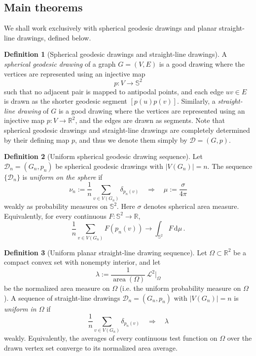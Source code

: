 \documentclass[reqno, 11pt]{amsart}
\theoremstyle{definition}
\newtheorem{definition}{Definition}
\newcommand{\dd}{\mathrm{d}}
\begin{document}
\subsection{Main theorems}


We shall work exclusively with spherical geodesic drawings and planar straight-line drawings, defined below.

\begin{definition}[Spherical geodesic drawings and straight-line drawings]\label{def:spherical-geodesic-drawing}
A \emph{spherical geodesic drawing} of a graph \(G=(V,E)\) is a good drawing where the vertices are represented using an injective map
\[
        p:V\longrightarrow {\mathbb S}^2
\]
such that no adjacent pair is mapped to antipodal points, and each edge \(uv\in E\) is drawn as the shorter geodesic segment \([p(u)p(v)]\). Similarly, a \emph{straight-line drawing} of $G$ is a good drawing where the vertices are represented using an injective map $p:V\to\mathbb R^2$, and the edges are drawn as segments. Note that spherical geodesic drawings and straight-line drawings are completely determined by their defining map $p$, and thus we denote them simply by ${\mathcal D} = (G,p)$.
\end{definition}

\begin{definition}[Uniform spherical geodesic drawing sequence]\label{def:uniform-spherical-geodesic-sequence}
Let \({\mathcal D}_n=(G_n,p_n)\) be spherical geodesic drawings with \(|V(G_n)|=n\).  The sequence \(\{{\mathcal D}_n\}\) is \emph{uniform on the sphere} if
\[
        \nu_n:=\frac1n\sum_{v\in V(G_n)}\delta_{p_n(v)}
        \quad\Longrightarrow\quad
        \mu:=\frac{\sigma}{4\pi}
\]
weakly as probability measures on \({\mathbb S}^2\). Here \(\sigma\) denotes spherical area measure. Equivalently, for every continuous \(F:{\mathbb S}^2\to{\mathbb R}\),
\[
        \frac1n\sum_{v\in V(G_n)}F(p_n(v))
        \longrightarrow
        \int_{{\mathbb S}^2}F\,\dd\mu\,.
\]
\end{definition}

\begin{definition}[Uniform planar straight-line drawing sequence]\label{def:uniform-planar-drawing-sequence}
Let \(\Omega\subset{\mathbb R}^2\) be a compact convex set with nonempty interior, and let
\[
        \lambda:=\frac{1}{\operatorname{area}(\Omega)}\,\mathcal L^2\big|_\Omega
\]
be the normalized area measure on \(\Omega\) (i.e. the uniform probability measure on $\Omega$). A sequence of straight-line drawings \({\mathcal D}_n=(G_n,p_n)\) with $|V(G_n)|=n$ is \emph{uniform in \(\Omega\)} if
\[
        \frac1n\sum_{v\in V(G_n)}\delta_{p_n(v)}
        \quad\Longrightarrow\quad
        \lambda
\]
weakly.  Equivalently, the averages of every continuous test function on \(\Omega\) over the drawn vertex set converge to its normalized area average.
\end{definition}
\end{document}
